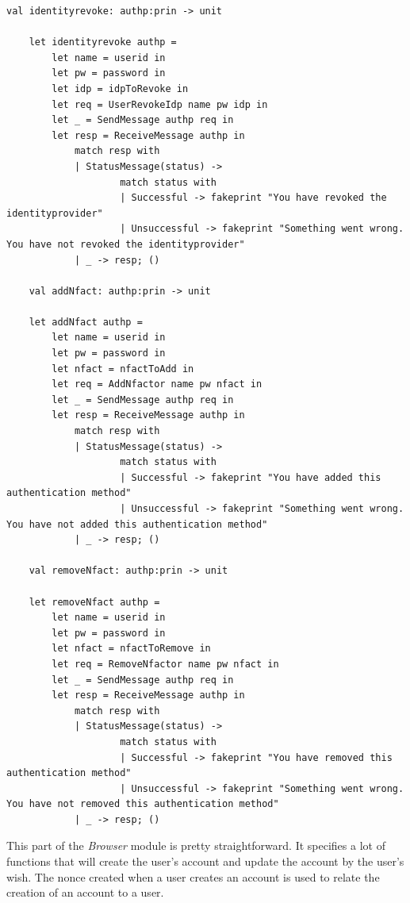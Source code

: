 \documentclass[twosided]{report}
\begin{document}
\begin{lstlisting}[style=fstar, caption={The Browser's side of the account creation and changing}]
	val identityrevoke: authp:prin -> unit

	let identityrevoke authp =
		let name = userid in
		let pw = password in
		let idp = idpToRevoke in
		let req = UserRevokeIdp name pw idp in
		let _ = SendMessage authp req in
		let resp = ReceiveMessage authp in
			match resp with
			| StatusMessage(status) ->
					match status with
					| Successful -> fakeprint "You have revoked the identityprovider"
					| Unsuccessful -> fakeprint "Something went wrong. You have not revoked the identityprovider"
			| _ -> resp; ()

	val addNfact: authp:prin -> unit

	let addNfact authp =
		let name = userid in
		let pw = password in
		let nfact = nfactToAdd in
		let req = AddNfactor name pw nfact in
		let _ = SendMessage authp req in
		let resp = ReceiveMessage authp in
			match resp with
			| StatusMessage(status) ->
					match status with
					| Successful -> fakeprint "You have added this authentication method"
					| Unsuccessful -> fakeprint "Something went wrong. You have not added this authentication method"
			| _ -> resp; ()

	val removeNfact: authp:prin -> unit

	let removeNfact authp =
		let name = userid in
		let pw = password in
		let nfact = nfactToRemove in
		let req = RemoveNfactor name pw nfact in
		let _ = SendMessage authp req in
		let resp = ReceiveMessage authp in
			match resp with
			| StatusMessage(status) ->
					match status with
					| Successful -> fakeprint "You have removed this authentication method"
					| Unsuccessful -> fakeprint "Something went wrong. You have not removed this authentication method"
			| _ -> resp; ()
\end{lstlisting}
This part of the \emph{Browser} module is pretty straightforward. It specifies a lot of functions that will create the user's account and update the account by the user's wish. The nonce created when a user creates an account is used to relate the creation of an account to a user.
\end{document}
